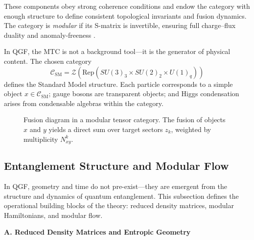 \documentclass[11pt]{article}
\begin{document}
These components obey strong coherence conditions and endow the category with enough structure to define consistent topological invariants and fusion dynamics. The category is \textit{modular} if its S-matrix is invertible, ensuring full charge–flux duality and anomaly-freeness \cite{Muger2003, Rowell2009}.

In QGF, the MTC is not a background tool—it is the generator of physical content. The chosen category
\[
\mathcal{C}_{\text{SM}} = \mathcal{Z}(\text{Rep}(SU(3)_3 \times SU(2)_2 \times U(1)_q))
\]
defines the Standard Model structure. Each particle corresponds to a simple object \( x \in \mathcal{C}_{\text{SM}} \); gauge bosons are transparent objects; and Higgs condensation arises from condensable algebras within the category.

\vspace{1em}
\begin{figure}[H]
\centering
{}
\caption{Fusion diagram in a modular tensor category. The fusion of objects \( x \) and \( y \) yields a direct sum over target sectors \( z_k \), weighted by multiplicity \( N_{xy}^k \).}
\label{fig:mtc-fusion}
\end{figure}



\subsection{Entanglement Structure and Modular Flow}

In QGF, geometry and time do not pre-exist—they are emergent from the structure and dynamics of quantum entanglement. This subsection defines the operational building blocks of the theory: reduced density matrices, modular Hamiltonians, and modular flow.

\vspace{0.5em}
\noindent\textbf{A. Reduced Density Matrices and Entropic Geometry}
\end{document}
